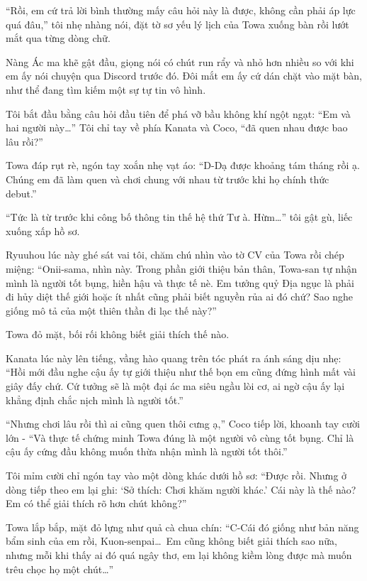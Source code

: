 \documentclass[../main.tex]{subfiles}
\begin{document}
``Rồi, em cứ trả lời bình thường mấy câu hỏi này là được, không cần phải áp lực quá đâu,'' tôi nhẹ nhàng nói, đặt tờ sơ yếu lý lịch của Towa xuống bàn rồi lướt mắt qua từng dòng chữ.

Nàng Ác ma khẽ gật đầu, giọng nói có chút run rẩy và nhỏ hơn nhiều so với khi em ấy nói chuyện qua Discord trước đó. Đôi mắt em ấy cứ dán chặt vào mặt bàn, như thể đang tìm kiếm một sự tự tin vô hình.

Tôi bắt đầu bằng câu hỏi đầu tiên để phá vỡ bầu không khí ngột ngạt: ``Em và hai người này\dots'' Tôi chỉ tay về phía Kanata và Coco, ``đã quen nhau được bao lâu rồi?''

Towa đáp rụt rè, ngón tay xoắn nhẹ vạt áo: ``D-Dạ được khoảng tám tháng rồi ạ. Chúng em đã làm quen và chơi chung với nhau từ trước khi họ chính thức debut.''

``Tức là từ trước khi công bố thông tin thế hệ thứ Tư à. Hừm\dots'' tôi gật gù, liếc xuống xấp hồ sơ.

Ryuuhou lúc này ghé sát vai tôi, chăm chú nhìn vào tờ CV của Towa rồi chép miệng: ``Onii-sama, nhìn này. Trong phần giới thiệu bản thân, Towa-san tự nhận mình là người tốt bụng, hiền hậu và thực tế nè. Em tưởng quỷ Địa ngục là phải đi hủy diệt thế giới hoặc ít nhất cũng phải biết nguyền rủa ai đó chứ? Sao nghe giống mô tả của một thiên thần đi lạc thế này?''

Towa đỏ mặt, bối rối không biết giải thích thế nào.

Kanata lúc này lên tiếng, vầng hào quang trên tóc phát ra ánh sáng dịu nhẹ: ``Hồi mới đầu nghe cậu ấy tự giới thiệu như thế bọn em cũng đứng hình mất vài giây đấy chứ. Cứ tưởng sẽ là một đại ác ma siêu ngầu lòi cơ, ai ngờ cậu ấy lại khẳng định chắc nịch mình là người tốt.''

``Nhưng chơi lâu rồi thì ai cũng quen thôi cưng ạ,'' Coco tiếp lời, khoanh tay cười lớn - ``Và thực tế chứng minh Towa đúng là một người vô cùng tốt bụng. Chỉ là cậu ấy cứng đầu không muốn thừa nhận mình là người tốt thôi.''

Tôi mỉm cười chỉ ngón tay vào một dòng khác dưới hồ sơ: ``Được rồi. Nhưng ở dòng tiếp theo em lại ghi: `Sở thích: Chơi khăm người khác.' Cái này là thế nào? Em có thể giải thích rõ hơn chút không?''

Towa lắp bắp, mặt đỏ lựng như quả cà chua chín: ``C-Cái đó giống như bản năng bẩm sinh của em rồi, Kuon-senpai\dots\ Em cũng không biết giải thích sao nữa, nhưng mỗi khi thấy ai đó quá ngây thơ, em lại không kiềm lòng được mà muốn trêu chọc họ một chút\dots''
\end{document}
